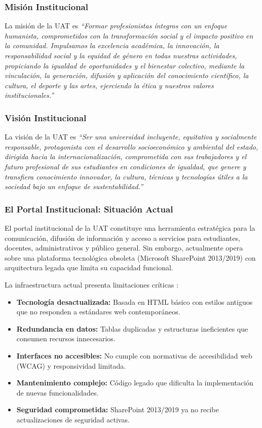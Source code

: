 \subsubsection*{Misión Institucional}

La misión de la UAT es \textit{``Formar profesionistas íntegros con un enfoque humanista, comprometidos con la transformación social y el impacto positivo en la comunidad. Impulsamos la excelencia académica, la innovación, la responsabilidad social y la equidad de género en todas nuestras actividades, propiciando la igualdad de oportunidades y el bienestar colectivo, mediante la vinculación, la generación, difusión y aplicación del conocimiento científico, la cultura, el deporte y las artes, ejerciendo la ética y nuestros valores institucionales.''}

\subsubsection*{Visión Institucional}

La visión de la UAT es \textit{``Ser una universidad incluyente, equitativa y socialmente responsable, protagonista con el desarrollo socioeconómico y ambiental del estado, dirigida hacia la internacionalización, comprometida con sus trabajadores y el futuro profesional de sus estudiantes en condiciones de igualdad, que genere y transfiera conocimiento innovador, la cultura, técnicas y tecnologías útiles a la sociedad bajo un enfoque de sustentabilidad.''}

\subsubsection*{El Portal Institucional: Situación Actual}

El portal institucional de la UAT constituye una herramienta estratégica para la comunicación, difusión de información y acceso a servicios para estudiantes, docentes, administrativos y público general. Sin embargo, actualmente opera sobre una plataforma tecnológica obsoleta (Microsoft SharePoint 2013/2019) con arquitectura legada que limita su capacidad funcional.

La infraestructura actual presenta limitaciones críticas \cite{microsoft2024sharepoint}:

\begin{itemize}
    \item \textbf{Tecnología desactualizada:} Basada en HTML básico con estilos antiguos que no responden a estándares web contemporáneos.
    \item \textbf{Redundancia en datos:} Tablas duplicadas y estructuras ineficientes que consumen recursos innecesarios.
    \item \textbf{Interfaces no accesibles:} No cumple con normativas de accesibilidad web (WCAG) y responsividad limitada.
    \item \textbf{Mantenimiento complejo:} Código legado que dificulta la implementación de nuevas funcionalidades.
    \item \textbf{Seguridad comprometida:} SharePoint 2013/2019 ya no recibe actualizaciones de seguridad activas.
\end{itemize}

